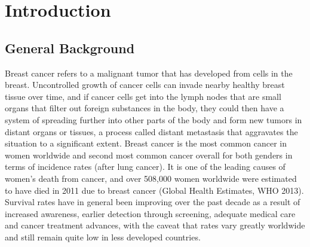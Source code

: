 \chapter{Introduction}
\label{chap:intro}

\section{General Background}

Breast cancer refers to a malignant tumor that has developed from cells in the breast. Uncontrolled growth of cancer cells can invade nearby healthy breast tissue over time, and if cancer cells get into the lymph nodes that are small organs that filter out foreign substances in the body, they could then have a system of spreading further into other parts of the body and form new tumors in distant organs or tissues, a process called distant metastasis that aggravates the situation to a significant extent. Breast cancer is the most common cancer in women worldwide and second most common cancer overall for both genders in terms of incidence rates (after lung cancer). It is one of the leading causes of women's death from cancer, and over 508,000 women worldwide were estimated to have died in 2011 due to breast cancer (Global Health Estimates, WHO 2013). Survival rates have in general been improving over the past decade as a result of increased awareness, earlier detection through screening, adequate medical care and cancer treatment advances, with the caveat that rates vary greatly worldwide and still remain quite low in less developed countries.


